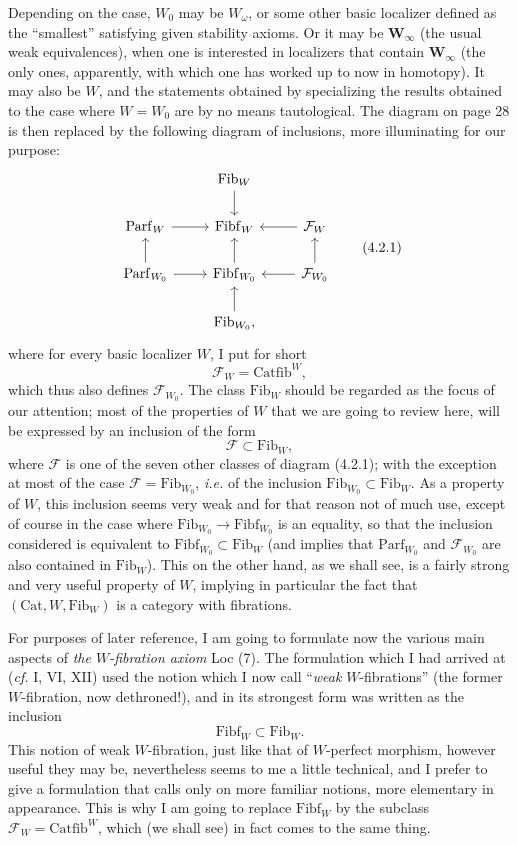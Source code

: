 \documentclass[11pt]{article}
\newcommand{\printedpage}[1]{\marginpar{\footnotesize p.~#1}}
\newcommand{\msp}[1]{\marginpar{\footnotesize [#1]}}
\newcommand{\Fib}{\mathrm{Fib}}
\newcommand{\Fibf}{\mathrm{Fibf}}
\newcommand{\Parf}{\mathrm{Parf}}
\newcommand{\Catfib}{\mathrm{Catfib}}
\newcommand{\Cat}{\mathrm{Cat}}
\begin{document}
Depending on the case, $W_0$ may be $W_\omega$, or some other basic localizer defined as the ``smallest'' satisfying given stability axioms. Or it may be $\mathbf{W}_\infty$ (the usual weak equivalences), when one is interested in localizers that contain $\mathbf{W}_\infty$ (the only ones, apparently, with which one has worked up to now in homotopy). It may also be $W$, and the statements obtained by specializing the results obtained to the case where $W = W_0$ are by no means tautological. The diagram on page 28 is then replaced by the following diagram of inclusions, more illuminating for our purpose:
\[
\begin{tikzcd}
 & \Fib_W \arrow[d] & \\
\Parf_W \arrow[r] & \Fibf_W & \mathcal{F}_W \arrow[l] \\
\Parf_{W_0} \arrow[r] \arrow[u] & \Fibf_{W_0} \arrow[u] & \mathcal{F}_{W_0} \arrow[l] \arrow[u] \\
 & \Fib_{W_0}, \arrow[u] &
\end{tikzcd}
\tag*{(4.2.1)}
\]
where for every basic localizer $W$, I put for short
\[
\mathcal{F}_W = \Catfib^W,
\]
which thus also defines $\mathcal{F}_{W_0}$. The class $\Fib_W$ \msp{page 31} should be regarded as the focus of our attention; most of the properties of $W$ that we are going to review here, will be expressed by an inclusion of the form
\[
\mathcal{F} \subset \Fib_W,
\]
where $\mathcal{F}$ is one of the seven other classes of diagram (4.2.1); with the exception at most of the case $\mathcal{F} = \Fib_{W_0}$, \textit{i.e.} of the inclusion $\Fib_{W_0} \subset \Fib_W$. As a property of $W$, this inclusion seems very weak and for that reason not of much use, except of course in the case where $\Fib_{W_0} \longrightarrow \Fibf_{W_0}$ is an equality, so that the inclusion considered is equivalent to $\Fibf_{W_0} \subset \Fib_W$ (and implies that $\Parf_{W_0}$ and $\mathcal{F}_{W_0}$ are also contained in $\Fib_W$). This on the other hand, as we shall see, is a fairly strong and very useful property of $W$, implying in particular the fact that $(\Cat, W, \Fib_W)$ is a category with fibrations.

\printedpage{21}

\msp{page 32}

For purposes of later reference, I am going to formulate now the various main aspects of \textit{the $W$-fibration axiom} Loc (7). The formulation which I had arrived at (\textit{cf.} I, VI, XII) used the notion which I now call ``\textit{weak} $W$-fibrations'' (the former $W$-fibration, now dethroned!), and in its strongest form was written as the inclusion %
\[
\Fibf_W \subset \Fib_W.
\]
This notion of weak $W$-fibration, just like that of $W$-perfect morphism, however useful they may be, nevertheless seems to me a little technical, and I prefer to give a formulation that calls only on more familiar notions, more elementary in appearance. This is why I am going to replace $\Fibf_W$ by the subclass $\mathcal{F}_W = \Catfib^W$, which (we shall see) in fact comes to the same thing.
\end{document}
